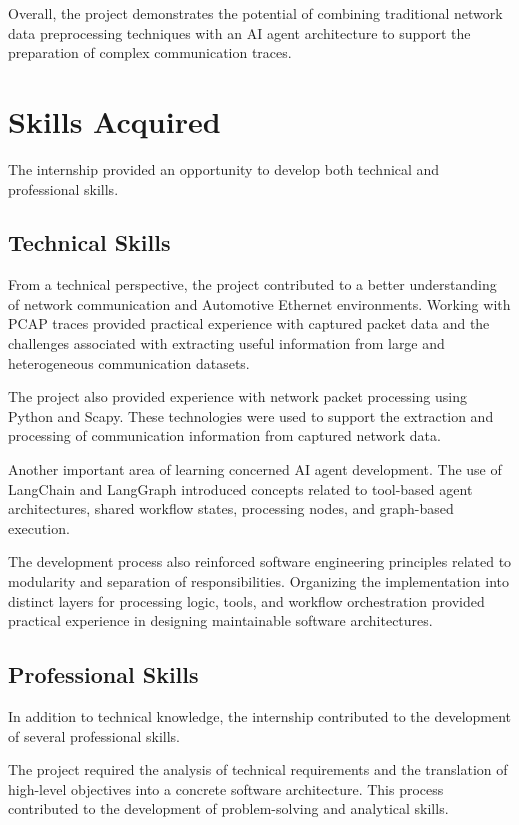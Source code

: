 Overall, the project demonstrates the potential of combining traditional network data preprocessing techniques with an AI agent architecture to support the preparation of complex communication traces.

\section{Skills Acquired}

The internship provided an opportunity to develop both technical and professional skills.

\subsection{Technical Skills}

From a technical perspective, the project contributed to a better understanding of network communication and Automotive Ethernet environments. Working with PCAP traces provided practical experience with captured packet data and the challenges associated with extracting useful information from large and heterogeneous communication datasets.

The project also provided experience with network packet processing using Python and Scapy. These technologies were used to support the extraction and processing of communication information from captured network data.

Another important area of learning concerned AI agent development. The use of LangChain and LangGraph introduced concepts related to tool-based agent architectures, shared workflow states, processing nodes, and graph-based execution.

The development process also reinforced software engineering principles related to modularity and separation of responsibilities. Organizing the implementation into distinct layers for processing logic, tools, and workflow orchestration provided practical experience in designing maintainable software architectures.

\subsection{Professional Skills}

In addition to technical knowledge, the internship contributed to the development of several professional skills.

The project required the analysis of technical requirements and the translation of high-level objectives into a concrete software architecture. This process contributed to the development of problem-solving and analytical skills.

